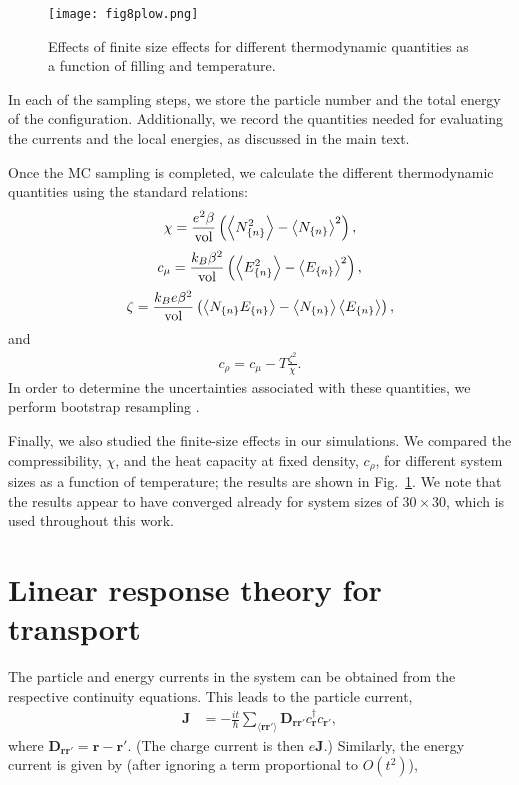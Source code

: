 \documentclass[aps,prx,onecolumn,amsmath,nofootinbib,amssymb,11pt]{revtex4-1}
\renewcommand{\vec}[1]{\boldsymbol{#1}}
\def \r {{\vec r}}
\def \beq {\begin{eqnarray}}
\def \eeq {\end{eqnarray}}
\def \tn {\textnormal}
\begin{document}
{\begin{appendix}
\begin{figure}
\centering
\texttt{[image: fig8plow.png]}
\caption{\textsf{Effects of finite size effects for different thermodynamic quantities as a function of filling and temperature.}}
\label{fig:finite-size} 
\end{figure} 

In each of the sampling steps, we store the particle number and the total energy of the configuration. Additionally, we record the quantities needed for evaluating the currents and the local energies, as discussed in the main text. 

Once the MC sampling is completed, we calculate the different thermodynamic quantities using the standard relations:
\beq
\chi=\frac{e^2 \beta}{ \tn{vol} }\left(\left\langle N_{\{n\}}^{2}\right\rangle -\left\langle N_{\{n\}}\right\rangle ^{2}\right),
\label{eq:flucreschi2}
\eeq
\beq
c_\mu=\frac{k_B \beta^2}{ \tn{vol} }\left(\left\langle E_{\{n\}}^{2}\right\rangle -\left\langle E_{\{n\}}\right\rangle ^{2}\right),
\label{eq:flucresc}
\eeq
\beq
\zeta=\frac{k_B e \beta^2}{ \tn{vol} }\left(\left\langle N_{\{n\}}E_{\{n\}}\right\rangle -\left\langle N_{\{n\}}\right\rangle \left\langle E_{\{n\}}\right\rangle\right),
\label{eq:flucresz}
\eeq
and 
\beq
c_{\rho}=c_{\mu}-T\frac{\zeta^{2}}{\chi}.
\eeq
In order to determine the uncertainties associated with these quantities, we perform bootstrap resampling \cite{degroot2012probability}. 


Finally, we also studied the finite-size effects in our simulations. We compared the compressibility, $\chi$, and the heat capacity at fixed density, $c_\rho$, for different system sizes as a function of temperature; the results are shown in Fig.~\ref{fig:finite-size}. We note that the results appear to have converged already for system sizes of $30\times30$, which is used throughout this work. 

\section{\textsf{Linear response theory for transport}}
\label{ap:LR}
The particle and energy currents in the system can be obtained from the respective continuity equations. 
This leads to the particle current,
\beq
 \bm{J} & =-\frac{it}{\hbar}\sum_{\langle \r\r'\rangle }\bm{D}_{\r\r'}c_{\r}^{\dagger}c_{\r'},
\eeq
where $\bm{D}_{\r\r'}=\r-\r'$. (The charge current is then $e\bm{J}$.) Similarly, the energy current is given by (after ignoring a term proportional to $O(t^2)$),


\end{appendix}}
\end{document}
